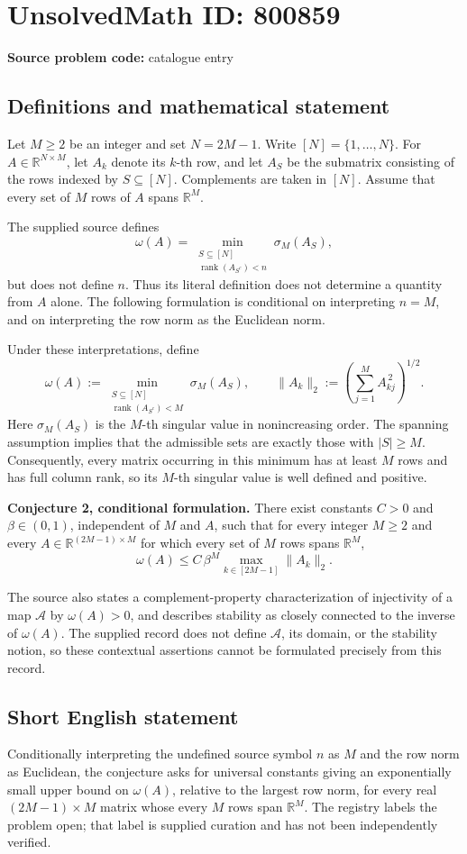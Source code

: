 \documentclass[11pt]{article}
\newcommand{\R}{\mathbb{R}}
\begin{document}
\section*{UnsolvedMath ID: 800859}
\textbf{Source problem code:} catalogue entry
\subsection{Definitions and mathematical statement}
Let \(M\geq 2\) be an integer and set \(N=2M-1\). Write \([N]=\{1,\ldots,N\}\). For \(A\in\R^{N\times M}\), let \(A_k\) denote its \(k\)-th row, and let \(A_S\) be the submatrix consisting of the rows indexed by \(S\subseteq[N]\). Complements are taken in \([N]\). Assume that every set of \(M\) rows of \(A\) spans \(\R^M\).

The supplied source defines
\[
\omega(A)=\min_{\substack{S\subseteq[N]\\ \operatorname{rank}(A_{S^c})<n}}\sigma_M(A_S),
\]
but does not define \(n\). Thus its literal definition does not determine a quantity from \(A\) alone. The following formulation is conditional on interpreting \(n=M\), and on interpreting the row norm as the Euclidean norm.

Under these interpretations, define
\[
\omega(A):=\min_{\substack{S\subseteq[N]\\ \operatorname{rank}(A_{S^c})<M}}\sigma_M(A_S),
\qquad
\|A_k\|_2:=\left(\sum_{j=1}^{M}A_{kj}^{\,2}\right)^{1/2}.
\]
Here \(\sigma_M(A_S)\) is the \(M\)-th singular value in nonincreasing order. The spanning assumption implies that the admissible sets are exactly those with \(|S|\geq M\). Consequently, every matrix occurring in this minimum has at least \(M\) rows and has full column rank, so its \(M\)-th singular value is well defined and positive.

\textbf{Conjecture 2, conditional formulation.} There exist constants \(C>0\) and \(\beta\in(0,1)\), independent of \(M\) and \(A\), such that for every integer \(M\geq2\) and every \(A\in\R^{(2M-1)\times M}\) for which every set of \(M\) rows spans \(\R^M\),
\[
\omega(A)\leq C\,\beta^M\max_{k\in[2M-1]}\|A_k\|_2.
\]

The source also states a complement-property characterization of injectivity of a map \(\mathcal A\) by \(\omega(A)>0\), and describes stability as closely connected to the inverse of \(\omega(A)\). The supplied record does not define \(\mathcal A\), its domain, or the stability notion, so these contextual assertions cannot be formulated precisely from this record.
\subsection{Short English statement}
Conditionally interpreting the undefined source symbol \(n\) as \(M\) and the row norm as Euclidean, the conjecture asks for universal constants giving an exponentially small upper bound on \(\omega(A)\), relative to the largest row norm, for every real \((2M-1)\times M\) matrix whose every \(M\) rows span \(\R^M\). The registry labels the problem open; that label is supplied curation and has not been independently verified.
\end{document}

